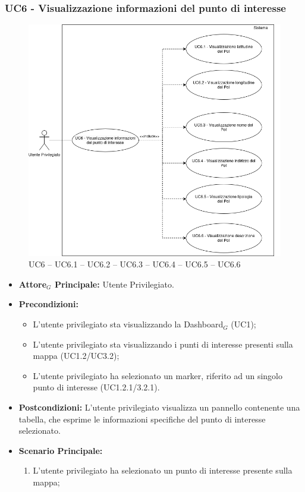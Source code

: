 \documentclass[11pt]{article}
\begin{document}
\begin{justify}
 \subsubsection{\textbf{UC6 - Visualizzazione informazioni del punto di interesse}}
\begin{figure}[H]
    \centering
    \includegraphics[width=0.7\linewidth]{UC6image.png}
    \caption{UC6 -- UC6.1 -- UC6.2 -- UC6.3 -- UC6.4 -- UC6.5 -- UC6.6}
    \label{fig:UC6}
\end{figure}
 \begin{itemize}
     \item \textbf{Attore$_G$ Principale:} Utente Privilegiato.
     \item \textbf{Precondizioni:}
       \begin{itemize}
    		\item L'utente privilegiato sta visualizzando la Dashboard$_G$ (UC1);
    	        \item L'utente privilegiato sta visualizzando i punti di interesse presenti sulla mappa (UC1.2/UC3.2);
    	        \item L'utente privilegiato ha selezionato un marker, riferito ad un singolo punto di interesse (UC1.2.1/3.2.1).
       \end{itemize}
     \item \textbf{Postcondizioni:} L'utente privilegiato visualizza un pannello contenente una tabella, che esprime le informazioni specifiche del punto di interesse selezionato.
     \item \textbf{Scenario Principale:}
        \begin{enumerate}
          \item L'utente privilegiato ha selezionato un punto di interesse presente sulla mappa;

\end{enumerate}
\end{itemize}
\end{justify}
\end{document}
